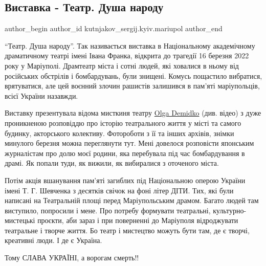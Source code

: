  
 
 
 
 

\subsection{Виставка - Театр. Душа народу}
\label{sec:16_03_2023.fb.kutnjakov_sergij.kyiv.mariupol.1.vystavka_teatr_dusha_narodu}

\ifcmt
 author_begin
   author_id kutnjakov_sergij.kyiv.mariupol
 author_end
\fi

\enquote{Театр. Душа народу}. Так називається виставка в Національному академічному
драматичному театрі імені Івана Франка, відкрита до трагедії 16 березня 2022 року у
Маріуполі. Драмтеатр міста і сотні людей, які ховалися в ньому від російських
обстрілів і бомбардувань, були знищені. Комусь пощастило вибратися,
врятуватися, але цей воєнний злочин рашистів залишився в пам'яті маріупольців,
всієї України назавжди.

Виставку презентувала відома мисткиня театру \href{\urlDemidkoIA}{Olga Demidko} (див. відео) з дуже
проникненою розповіддю про історію театрального життя у місті та самого
будинку, акторського колективу. Фотороботи з її та інших архівів, знімки
минулого березня можна переглянути тут. Мені довелося розповісти японським
журналістам про долю моєї родини, яка перебувала під час бомбардування в драмі.
Як попали туди, як вижили, як вибиралися з оточеного міста.

Потім акція вшанування пам'яті загиблих під Національною оперою України імені 
Т. Г. Шевченка з десятків свічок на фоні літер ДІТИ. Тих, які були написані на
Театральній площі перед Маріупольським драмом. Багато людей там виступило,
попросили і мене. Про потребу формувати театральні, культурно-мистецькі
проєкти, аби зараз і при поверненні до Маріуполя відроджувати театральне і
творче життя. Бо театр і мистецтво можуть бути там, де є творчі, креативні
люди. І де є Україна.

Тому СЛАВА УКРАЇНІ, а ворогам смерть!!
